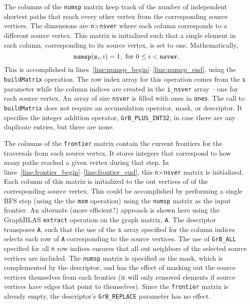 The columns of the {\tt numsp} matrix keep track of the number of independent 
shortest paths that reach every other vertex from the corresponding source 
vertices.  The dimensions are {\tt n}$\times${\tt nsver} where each column corresponds
to a different source vertex.  This matrix is initialized such that a single
element in each column, corresponding to its source vertex, 
is set to one.  Mathematically,
\begin{equation}
	{\tt numsp}({{\tt s}_i},i) = 1, \text{ for }  0 \leq i < {\tt nsver}.
\label{eqn:bc}
\end{equation}
This is accomplished in lines~\ref{line:numsp_begin}--\ref{line:numsp_end}.
using the {\tt buildMatrix} operation.  The row index array for this operation comes from 
the {\tt s} parameter while the column indices are created in the {\tt i\_nsver}
array -- one for each source vertex.  An array of size {\tt nsver} is filled 
with ones in {\tt ones}.  The call to {\tt buildMatrix} does 
not require an accumulation operator, mask, or descriptor.  It specifies
the integer addition operator, {\tt GrB\_PLUS\_INT32}, in case there are any
duplicate entries, but there are none.

The columns of the {\tt frontier} matrix contain the current frontiers for the
traversals from each source vertex.  It stores integers that correspond to how
many paths reached a given vertex during that step. 
In lines~\ref{line:frontier_begin}--\ref{line:frontier_end}, this
{\tt n}$\times${\tt nsver} matrix is initialized.  Each column of this 
matrix is initialized to the out vertices of of the corresponding source
vertex.  This could be accomplished by performing a single BFS step (using the 
the {\tt mxm} operation) using the {\tt numsp} matrix as the input frontier.
An alternate (more efficient?) approach is shown here using the GraphBLAS {\tt extract}
operation on the graph matrix, {\tt A}.  The descriptor transposes {\tt A}, such that
the use of the {\tt s} array specified for the column indices selects
each row of {\tt A} corresponding to the source vertices.
The use of {\tt GrB\_ALL} specified for all {\tt n} row indices 
ensures that all out neighbors of the selected source vertices are included.  
The {\tt numsp} matrix
is specified as the mask, which is complemented by the descriptor, and has the
effect of masking out the source vertices themselves from 
each frontier (it will only removed elements if source vertices have edges that point
to themselves).  Since the {\tt frontier} matrix is already empty, the 
descriptor's {\tt GrB\_REPLACE} parameter has no effect.

